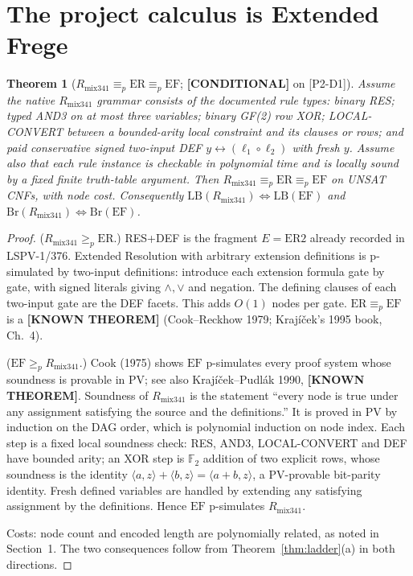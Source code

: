 \documentclass[11pt]{article}
\newtheorem{theorem}{Theorem}
\theoremstyle{definition}
\theoremstyle{remark}
\newcommand{\EF}{\mathrm{EF}}
\newcommand{\ER}{\mathrm{ER}}
\newcommand{\PV}{\mathrm{PV}}
\newcommand{\Rmix}{R_{\mathrm{mix341}}}
\newcommand{\status}[1]{\textbf{[#1]}}
\begin{document}
\section{The project calculus is Extended Frege}
\begin{theorem}[$\Rmix\equiv_p\ER\equiv_p\EF$; \status{CONDITIONAL} on {[P2-D1]}]\label{thm:mixEF}
Assume the native $\Rmix$ grammar consists of the documented rule types:
binary RES; typed AND3 on at most three variables; binary GF(2) row XOR; LOCAL-CONVERT between a
bounded-arity local constraint and its clauses or rows; and paid conservative signed two-input DEF
$y\leftrightarrow(\ell_1\circ\ell_2)$ with fresh $y$. Assume also that each rule instance is checkable in
polynomial time and is locally sound by a fixed finite truth-table argument. Then
$\Rmix\equiv_p\ER\equiv_p\EF$ on UNSAT CNFs, with node cost. Consequently
$\mathrm{LB}(\Rmix)\Leftrightarrow\mathrm{LB}(\EF)$ and $\mathrm{Br}(\Rmix)\Leftrightarrow\mathrm{Br}(\EF)$.
\end{theorem}
\begin{proof}
($\Rmix\ge_p\ER$.) RES+DEF is the fragment $E=\mathrm{ER2}$ already recorded in LSPV-1/376.
Extended Resolution with arbitrary extension definitions is p-simulated by two-input definitions:
introduce each extension formula gate by gate, with signed literals giving $\wedge,\vee$ and negation.
The defining clauses of each two-input gate are the DEF facets. This adds $O(1)$ nodes per gate.
$\ER\equiv_p\EF$ is a \status{KNOWN THEOREM} (Cook--Reckhow 1979; Kraj\'i\v{c}ek's 1995 book, Ch.~4).

($\EF\ge_p\Rmix$.) Cook (1975) shows $\EF$ p-simulates every proof system whose soundness is
provable in $\PV$; see also Kraj\'i\v{c}ek--Pudl\'ak 1990, \status{KNOWN THEOREM}.
Soundness of $\Rmix$ is the statement ``every node is true under any assignment satisfying the
source and the definitions.'' It is proved in $\PV$ by induction on the DAG order, which is
polynomial induction on node index. Each step is a fixed local soundness check:
RES, AND3, LOCAL-CONVERT and DEF have bounded arity; an XOR step is $\mathbb F_2$ addition of two
explicit rows, whose soundness is the identity $\langle a,z\rangle+\langle b,z\rangle=\langle a+b,z\rangle$,
a $\PV$-provable bit-parity identity. Fresh defined variables are handled by extending any
satisfying assignment by the definitions. Hence $\EF$ p-simulates $\Rmix$.

Costs: node count and encoded length are polynomially related, as noted in Section~1.
The two consequences follow from Theorem~\ref{thm:ladder}(a) in both directions.
\end{proof}
\end{document}
